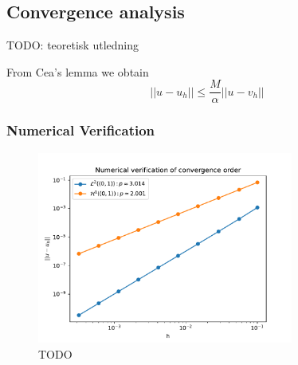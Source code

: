 \subsection{Convergence analysis}


TODO: teoretisk utledning

From Cea's lemma we obtain
\begin{equation}
    ||u - u_h|| \leq \frac{M}{\alpha}||u - v_h||
\end{equation}

\subsubsection{Numerical Verification}


\begin{figure}[!h]
  \centering
  \includegraphics[width=0.75\textwidth]{Images/plots/task1_conv_plot.pdf}
  \caption{TODO}
  \label{fig:conv_plot}
\end{figure}

